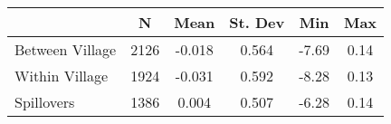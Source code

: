 \begin{tabular}{l*{5}{c}}\hline&\multicolumn{1}{c}{N}&\multicolumn{1}{c}{Mean}&\multicolumn{1}{c}{St. Dev}&\multicolumn{1}{c}{Min}&\multicolumn{1}{c}{Max}\\ \hline 
Between Village & 2126 & -0.018 & 0.564 & -7.69 & 0.14 \\
Within Village & 1924 & -0.031 & 0.592 & -8.28 & 0.13 \\
Spillovers & 1386 & 0.004 & 0.507 & -6.28 & 0.14 \\
\hline \end{tabular}
